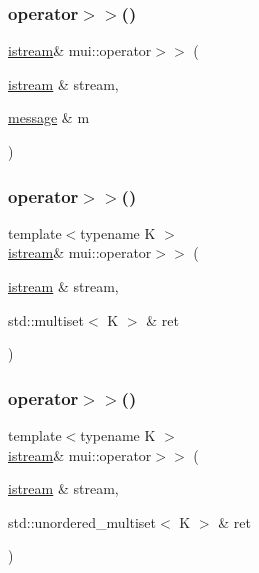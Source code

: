 \mbox{\label{namespacemui_a5311e744d62b82539f8da80c4860b1e2}} 
\subsubsection{\texorpdfstring{operator$>$$>$()}{operator>>()}\hspace{0.1cm}{\footnotesize\ttfamily [13/20]}}
{\footnotesize\ttfamily \hyperlink{classmui_1_1istream}{istream}\& mui\+::operator$>$$>$ (\begin{DoxyParamCaption}\item[{\hyperlink{classmui_1_1istream}{istream} \&}]{stream,  }\item[{\hyperlink{structmui_1_1message}{message} \&}]{m }\end{DoxyParamCaption})\hspace{0.3cm}{\ttfamily [inline]}}

\mbox{\label{namespacemui_af42f3202ee63df10d4df353f88eb16d4}} 
\subsubsection{\texorpdfstring{operator$>$$>$()}{operator>>()}\hspace{0.1cm}{\footnotesize\ttfamily [14/20]}}
{\footnotesize\ttfamily template$<$typename K $>$ \\
\hyperlink{classmui_1_1istream}{istream}\& mui\+::operator$>$$>$ (\begin{DoxyParamCaption}\item[{\hyperlink{classmui_1_1istream}{istream} \&}]{stream,  }\item[{std\+::multiset$<$ K $>$ \&}]{ret }\end{DoxyParamCaption})\hspace{0.3cm}{\ttfamily [inline]}}

\mbox{\label{namespacemui_adefa60318c46c05b933ad960b5b19db0}} 
\subsubsection{\texorpdfstring{operator$>$$>$()}{operator>>()}\hspace{0.1cm}{\footnotesize\ttfamily [15/20]}}
{\footnotesize\ttfamily template$<$typename K $>$ \\
\hyperlink{classmui_1_1istream}{istream}\& mui\+::operator$>$$>$ (\begin{DoxyParamCaption}\item[{\hyperlink{classmui_1_1istream}{istream} \&}]{stream,  }\item[{std\+::unordered\+\_\+multiset$<$ K $>$ \&}]{ret }\end{DoxyParamCaption})\hspace{0.3cm}{\ttfamily [inline]}}

